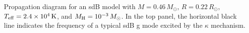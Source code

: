 \label{fig:sdBProp}
Propagation diagram for an sdB model with $M=0.46 \, M_\odot$, $R= 0.22 \, R_\odot$, $T_{\rm eff} = 2.4 \times 10^4 \, {\rm K}$, and $M_{\rm H} = 10^{-3} \, M_\odot$. In the top panel, the horizontal black line indicates the frequency of a typical sdB g mode excited by the $\kappa$ mechanism. 
  
  